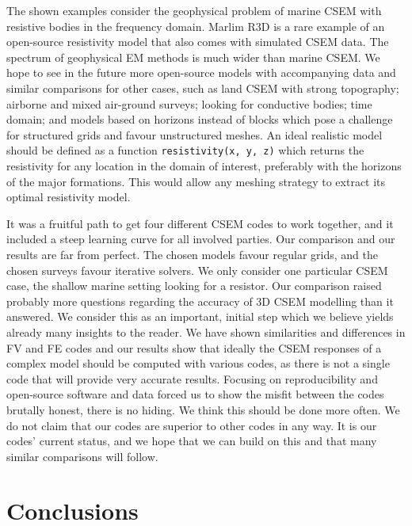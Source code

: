 \documentclass[extra, camera,%
]{gji}
\begin{document}
The shown examples consider the geophysical problem of marine CSEM with resistive bodies in the frequency domain. Marlim R3D is a rare example of an open-source resistivity model that also comes with simulated CSEM data. The spectrum of geophysical EM methods is much wider than marine CSEM. We hope to see in the future more open-source models with accompanying data and similar comparisons for other cases, such as land CSEM with strong topography; airborne and mixed air-ground surveys; looking for conductive bodies; time domain; and models based on horizons instead of blocks which pose a challenge for structured grids and favour unstructured meshes. An ideal realistic model should be defined as a function \texttt{resistivity(x, y, z)} which returns the resistivity for any location in the domain of interest, preferably with the horizons of the major formations. This would allow any meshing strategy to extract its optimal resistivity model.

It was a fruitful path to get four different CSEM codes to work together, and it included a steep learning curve for all involved parties. Our comparison and our results are far from perfect. The chosen models favour regular grids, and the chosen surveys favour iterative solvers. We only consider one particular CSEM case, the shallow marine setting looking for a resistor. Our comparison raised probably more questions regarding the accuracy of 3D CSEM modelling than it answered. We consider this as an important, initial step which we believe yields already many insights to the reader. We have shown similarities and differences in FV and FE codes and our results show that ideally the CSEM responses of a complex model should be computed with various codes, as there is not a single code that will provide very accurate results. Focusing on reproducibility and open-source software and data forced us to show the misfit between the codes brutally honest, there is no hiding. We think this should be done more often. We do not claim that our codes are superior to other codes in any way. It is our codes' current status, and we hope that we can build on this and that many similar comparisons will follow.

\section{Conclusions}
\end{document}
